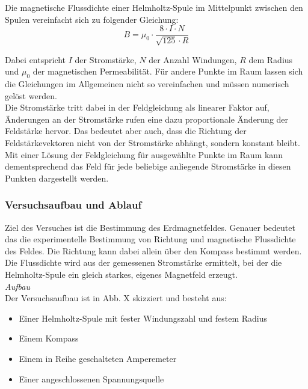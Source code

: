 Die magnetische Flussdichte einer Helmholtz-Spule im Mittelpunkt zwischen den Spulen vereinfacht sich zu folgender Gleichung:
\begin{equation}
	\label{eq:mfield}
	B = \mu_{0} \cdot \frac{8 \cdot I \cdot N}{\sqrt{125} \cdot R}
\end{equation}

Dabei entspricht $I$ der Stromstärke, $N$ der Anzahl Windungen, $R$ dem Radius und $\mu_{0}$ der magnetischen Permeabilität. Für andere Punkte im Raum lassen sich die Gleichungen im Allgemeinen nicht so vereinfachen und müssen numerisch gelöst werden.\\

Die Stromstärke tritt dabei in der Feldgleichung als linearer Faktor auf, Änderungen an der Stromstärke rufen eine dazu proportionale Änderung der Feldstärke hervor. Das bedeutet aber auch, dass die Richtung der Feldstärkevektoren nicht von der Stromstärke abhängt, sondern konstant bleibt. Mit einer Lösung der Feldgleichung für ausgewählte Punkte im Raum kann dementsprechend das Feld für jede beliebige anliegende Stromstärke in diesen Punkten dargestellt werden.\\

\subsubsection{Versuchsaufbau und Ablauf}
Ziel des Versuches ist die Bestimmung des Erdmagnetfeldes. Genauer bedeutet das die experimentelle Bestimmung von Richtung und magnetische Flussdichte des Feldes. Die Richtung kann dabei allein über den Kompass bestimmt werden. Die Flussdichte wird aus der gemessenen Stromstärke ermittelt, bei der die Helmholtz-Spule ein gleich starkes, eigenes Magnetfeld erzeugt.\\

\textit{Aufbau}\\
Der Versuchsaufbau ist in Abb. X skizziert und besteht aus: 
\begin{itemize}
	\setlength{\itemsep}{-5pt}
	\item Einer Helmholtz-Spule mit fester Windungszahl und festem Radius
	\item Einem Kompass
	\item Einem in Reihe geschalteten Amperemeter
	\item Einer angeschlossenen Spannungsquelle
\end{itemize}

